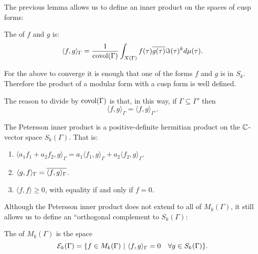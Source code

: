 The previous lemma allows us to define an inner product on the spaces of cusp forms:
\begin{definition}
  The  of $f$ and $g$ is:
\[
\langle f,g\rangle_\Gamma = \frac{1}{\operatorname{covol}(\Gamma)}\int_{X(\Gamma)} f(\tau)\overline{g(\tau)} \Im(\tau)^kd\mu(\tau).
\]
\end{definition}
\begin{remark}
  For the above to converge it is enough that one of the forms $f$ and $g$ is in $S_k$. Therefore the product of a modular form with a cusp form is well defined.
\end{remark}
\begin{remark}
  The reason to divide by $\operatorname{covol}(\Gamma)$ is that, in this way, if $\Gamma\subseteq \Gamma'$ then
\[
\langle f,g\rangle_\Gamma=\langle f,g\rangle_{\Gamma'}.
\]
\end{remark}
\begin{proposition}
  The Petersson inner product is a positive-definite hermitian product on the $\mathbb{C}$-vector space $S_k(\Gamma)$. That is:
  \begin{enumerate}
  \item $\langle a_1 f_1 + a_2 f_2,g\rangle_\Gamma = a_1\langle f_1,g\rangle_\Gamma + a_2\langle f_2,g\rangle_\Gamma$.
  \item $\langle g,f\rangle_\Gamma = \overline{\langle f,g\rangle_\Gamma}$.
  \item $\langle f,f\rangle\geq 0$, with equality if and only if $f=0$.
  \end{enumerate}
\end{proposition}

Although the Petersson inner product does not extend to all of $M_k(\Gamma)$, it still allows us to define an ``orthogonal complement to $S_k(\Gamma)$:
\begin{definition}
  The  of $M_k(\Gamma)$ is the space
\[
\mathcal{E}_k(\Gamma) = \{f\in M_k(\Gamma)~|~ \langle f,g\rangle_\Gamma =0 \quad \forall g\in S_k(\Gamma)\}.
\]
\end{definition}
